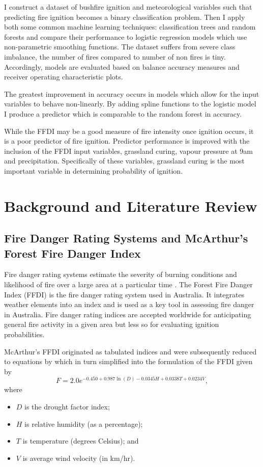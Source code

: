 \documentclass[11pt,a4paper]{article}
\begin{document}
I construct a dataset of bushfire ignition and meteorological variables such that predicting fire ignition becomes a binary classification problem. Then I apply both some common machine learning techniques: classification trees and random forests and compare their performance to logistic regression models which use non-parametric smoothing functions. The dataset suffers from severe class imbalance, the number of fires compared to number of non fires is tiny. Accordingly, models are evaluated based on balance accuracy measures and receiver operating characteristic plots. 

The greatest improvement in accuracy occurs in models which allow for the input variables to behave non-linearly. By adding spline functions to the logistic model I produce a predictor which is comparable to the random forest in accuracy. 

While the FFDI may be a good measure of fire intensity once ignition occurs, it is a poor predictor of fire ignition. Predictor performance is improved with the inclusion of the FFDI input variables, grassland curing, vapour pressure at 9am and precipitation. Specifically of these variables, grassland curing is the most important variable in determining probability of ignition. 


\section{Background and Literature Review}

\subsection{Fire Danger Rating Systems and McArthur's Forest Fire Danger Index}
Fire danger rating systems estimate the severity of burning conditions and likelihood of fire over a large area at a particular time \citep{chandler83, andrews03}. The Forest Fire Danger Index (FFDI) \citep{mcarthur67} is the fire danger rating system used in Australia. It integrates weather elements into an index and is used as a key tool in assessing fire danger in Australia. Fire danger rating indices are accepted worldwide for anticipating general fire activity in a given area but less so for evaluating ignition probabilities. 

McArthur's FFDI originated as tabulated indices and were subsequently reduced to equations by \citet{noble80} which in turn simplified into the formulation of the FFDI given by
\begin{equation}
\label{eq FFDI}
F=2.0 e^{-0.450 + 0.987 \ln(D)-0.0345H+0.0338T+0.0234V},
\end{equation}
where 
\begin{itemize}
	\item $D$ is the drought factor index;
	\item $H$ is relative humidity (as a percentage);
	\item $T$ is temperature (degrees Celsius); and
	\item $V$ is average wind velocity (in km/hr).
\end{itemize}
\end{document}
